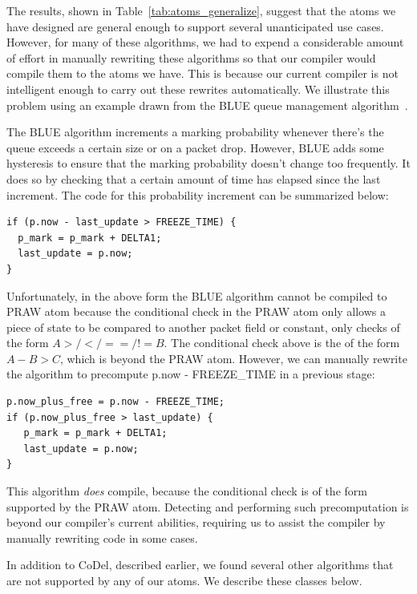 
The results, shown in Table~\ref{tab:atoms_generalize}, suggest that the atoms
we have designed are general enough to support several unanticipated use cases.
However, for many of these algorithms, we had to expend a considerable amount
of effort in manually rewriting these algorithms so that our compiler would
compile them to the atoms we have. This is because our current compiler is not
intelligent enough to carry out these rewrites automatically. We illustrate
this problem using an example drawn from the BLUE queue management
algorithm~\cite{blue}.

The BLUE algorithm increments a marking probability whenever there's the queue
exceeds a certain size or on a packet drop. However, BLUE adds some hysteresis
to ensure that the marking probability doesn't change too frequently. It does
so by checking that a certain amount of time has elapsed since the last
increment. The code for this probability increment can be summarized below:

\begin{verbatim}
if (p.now - last_update > FREEZE_TIME) {
  p_mark = p_mark + DELTA1;
  last_update = p.now;
}
\end{verbatim}

Unfortunately, in the above form the BLUE algorithm cannot be compiled to PRAW
atom because the conditional check in the PRAW atom only allows a piece of
state to be compared to another packet field or constant, \ie only checks of
the form $A >/</==/!= B$. The conditional check above is the of the form $A - B
> C$, which is beyond the PRAW atom. However, we can manually rewrite the algorithm
to precompute p.now - FREEZE\_TIME in a previous stage:

\begin{verbatim}
p.now_plus_free = p.now - FREEZE_TIME;
if (p.now_plus_free > last_update) {
   p_mark = p_mark + DELTA1;
   last_update = p.now;
}
\end{verbatim}

This algorithm {\em does} compile, because the conditional check is of the form
supported by the PRAW atom. Detecting and performing such precomputation is
beyond our compiler's current abilities, requiring us to assist the compiler by
manually rewriting code in some cases. 

 In addition to CoDel,
described earlier, we found several other algorithms that are not supported by
any of our atoms. We describe these classes below.

